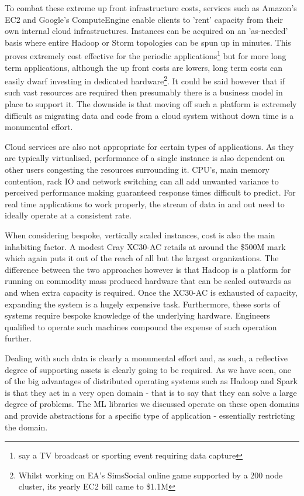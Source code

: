 \documentclass[a4paper,11pt]{scrreprt}
\begin{document}
To combat these extreme up front infrastructure costs, services such as Amazon's EC2 and Google's ComputeEngine enable clients to 'rent' capacity from their own internal cloud infrastructures. Instances can be acquired on an 'as-needed' basis where entire Hadoop or Storm topologies can be spun up in minutes. This proves extremely cost effective for the periodic applications\footnote{say a TV broadcast or sporting event requiring data capture} but for more long term applications, although the up front costs are lowers, long term costs can easily dwarf investing in dedicated hardware\footnote{Whilst working on EA's SimsSocial online game supported by a 200 node cluster, its yearly EC2 bill came to \$1.1M}. It could be said however that if such vast resources are required then presumably there is a business model in place to support it. The downside is that moving off such a platform is extremely difficult as migrating data and code from a cloud system without down time is a monumental effort.\

Cloud services are also not appropriate for certain types of applications. As they are typically virtualised, performance of a single instance is also dependent on other users congesting the resources surrounding it. CPU's, main memory contention, rack IO and network switching can all add unwanted variance to perceived performance making guaranteed response times difficult to predict. For real time applications to work properly, the stream of data in and out need to ideally operate at a consistent rate.

When considering bespoke, vertically scaled instances, cost is also the main inhabiting factor. A modest Cray XC30-AC retails at around the \$500M mark which again puts it out of the reach of all but the largest organizations. The difference between the two approaches however is that Hadoop is a platform for running on commodity mass produced hardware that can be scaled outwards as and when extra capacity is required. Once the XC30-AC is exhausted of capacity, expanding the system is a hugely expensive task. Furthermore, these sorts of systems require bespoke knowledge of the underlying hardware. Engineers qualified to operate such machines compound the expense of such operation further.

Dealing with such data is clearly a monumental effort and, as such, a reflective degree of supporting assets is clearly going to be required. As we have seen, one of the big advantages of distributed operating systems such as Hadoop and Spark is that they act in a very open domain - that is to say that they can solve a large degree of problems.  The ML libraries we discussed operate on these open domains and provide abstractions for a specific type of application - essentially restricting the domain.\\
\end{document}
